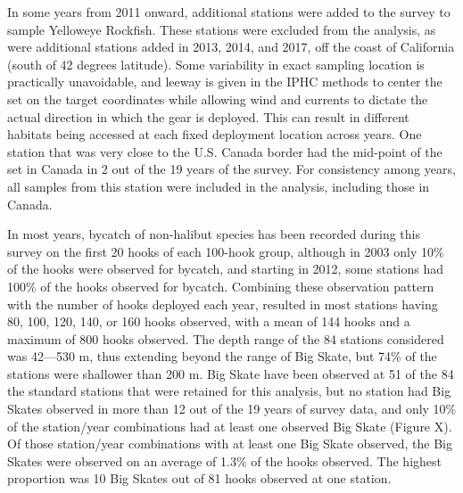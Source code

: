 \documentclass[12pt,]{article}
\begin{document}
In some years from 2011 onward, additional stations were added to the
survey to sample Yelloweye Rockfish. These stations were excluded from
the analysis, as were additional stations added in 2013, 2014, and 2017,
off the coast of California (south of 42 degrees latitude). Some
variability in exact sampling location is practically unavoidable, and
leeway is given in the IPHC methods to center the set on the target
coordinates while allowing wind and currents to dictate the actual
direction in which the gear is deployed. This can result in different
habitats being accessed at each fixed deployment location across years.
One station that was very close to the U.S. Canada border had the
mid-point of the set in Canada in 2 out of the 19 years of the survey.
For consistency among years, all samples from this station were included
in the analysis, including those in Canada.

In most years, bycatch of non-halibut species has been recorded during
this survey on the first 20 hooks of each 100-hook group, although in
2003 only 10\% of the hooks were observed for bycatch, and starting in
2012, some stations had 100\% of the hooks observed for bycatch.
Combining these observation pattern with the number of hooks deployed
each year, resulted in most stations having 80, 100, 120, 140, or 160
hooks observed, with a mean of 144 hooks and a maximum of 800 hooks
observed. The depth range of the 84 stations considered was 42---530 m,
thus extending beyond the range of Big Skate, but 74\% of the stations
were shallower than 200 m. Big Skate have been observed at 51 of the 84
the standard stations that were retained for this analysis, but no
station had Big Skates observed in more than 12 out of the 19 years of
survey data, and only 10\% of the station/year combinations had at least
one observed Big Skate (Figure X). Of those station/year combinations
with at least one Big Skate observed, the Big Skates were observed on an
average of 1.3\% of the hooks observed. The highest proportion was 10
Big Skates out of 81 hooks observed at one station.
\end{document}
